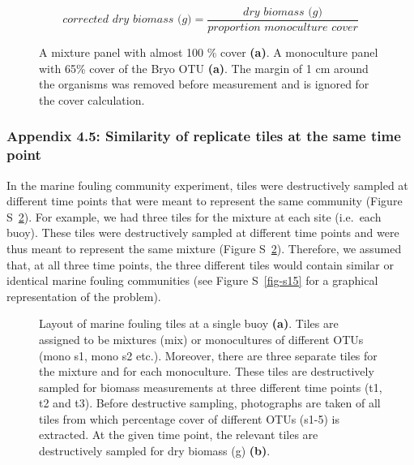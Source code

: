 \documentclass[
  letterpaper,
  DIV=11,
  numbers=noendperiod]{scrartcl}
\begin{document}
\[
\textit{corrected dry biomass (g)} = \frac{\textit{dry biomass (g)}}{\textit{proportion monoculture cover}} \tag{Equation S14}
\]

\begin{figure}


\caption{\label{fig-s13}A mixture panel with almost 100 \% cover
\textbf{(a)}. A monoculture panel with 65\% cover of the Bryo OTU
\textbf{(a)}. The margin of 1 cm around the organisms was removed before
measurement and is ignored for the cover calculation.}

\end{figure}%

\subsubsection{Appendix 4.5: Similarity of replicate tiles at the same
time
point}\label{appendix-4.5-similarity-of-replicate-tiles-at-the-same-time-point}

In the marine fouling community experiment, tiles were destructively
sampled at different time points that were meant to represent the same
community (Figure S~\ref{fig-s14}). For example, we had three tiles for
the mixture at each site (i.e.~each buoy). These tiles were
destructively sampled at different time points and were thus meant to
represent the same mixture (Figure S~\ref{fig-s14}). Therefore, we
assumed that, at all three time points, the three different tiles would
contain similar or identical marine fouling communities (see Figure
S~\ref{fig-s15} for a graphical representation of the problem).

\begin{figure}


\caption{\label{fig-s14}Layout of marine fouling tiles at a single buoy
\textbf{(a)}. Tiles are assigned to be mixtures (mix) or monocultures of
different OTUs (mono s1, mono s2 etc.). Moreover, there are three
separate tiles for the mixture and for each monoculture. These tiles are
destructively sampled for biomass measurements at three different time
points (t1, t2 and t3). Before destructive sampling, photographs are
taken of all tiles from which percentage cover of different OTUs (s1-5)
is extracted. At the given time point, the relevant tiles are
destructively sampled for dry biomass (g) \textbf{(b)}.}

\end{figure}%
\end{document}
